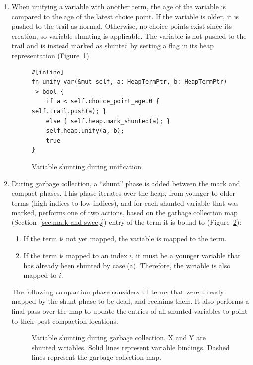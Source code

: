 \begin{enumerate}
\item When unifying a variable with another term, the age of the variable is compared to the age of the latest choice point. If the variable is older, it is pushed to the trail as normal. Otherwise, no choice points exist since its creation, so variable shunting is applicable. The variable is not pushed to the trail and is instead marked as shunted by setting a flag in its heap representation (Figure~\ref{fig:unify-var}).

\begin{figure}[H]
\centering
\begin{verbatim}
#[inline]
fn unify_var(&mut self, a: HeapTermPtr, b: HeapTermPtr) -> bool {
    if a < self.choice_point_age.0 { self.trail.push(a); }
    else { self.heap.mark_shunted(a); }
    self.heap.unify(a, b);
    true
}
\end{verbatim}
\caption{Variable shunting during unification}
\label{fig:unify-var}
\end{figure}

\item During garbage collection, a ``shunt'' phase is added between the mark and compact phases. This phase iterates over the heap, from younger to older terms (high indices to low indices), and for each shunted variable that was marked, performs one of two actions, based on the garbage collection map (Section~\ref{sec:mark-and-sweep}) entry of the term it is bound to (Figure~\ref{fig:shunt-cases}):
\begin{enumerate}
\item If the term is not yet mapped, the variable is mapped to the term.
\item If the term is mapped to an index $i$, it must be a younger variable that has already been shunted by case (a). Therefore, the variable is also mapped to $i$.
\end{enumerate}

The following compaction phase considers all terms that were already mapped by the shunt phase to be dead, and reclaims them. It also performs a final pass over the map to update the entries of all shunted variables to point to their post-compaction locations.

\begin{figure}[H]
\centering
{}
\caption{Variable shunting during garbage collection. X and Y are shunted variables. Solid lines represent variable bindings. Dashed lines represent the garbage-collection map.}
\label{fig:shunt-cases}
\end{figure}

\end{enumerate}
